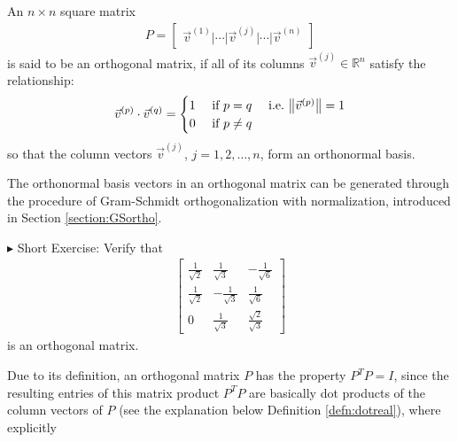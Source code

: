 \begin{defn}
\label{defn:orthomatrix}
An $n \times n$ square matrix
\begin{align*}
P = \begin{bmatrix}
\vec{v}^{(1)}|\cdots|\vec{v}^{(j)}|\cdots|\vec{v}^{(n)}   
\end{bmatrix}
\end{align*}
is said to be an orthogonal matrix, if all of its columns $\vec{v}^{(j)} \in \mathbb{R}^n$ satisfy the relationship:
\begin{align}
\vec{v}^{(p)} \cdot \vec{v}^{(q)} =
\begin{cases}
1 &\text{ if } p = q \quad \text{ i.e.\ } \norm{\vec{v}^{(p)}} = 1 \\
0 &\text{ if } p \neq q    
\end{cases}
\end{align}
so that the column vectors $\vec{v}^{(j)}$, $j=1,2,\ldots,n$, form an orthonormal basis.
\end{defn}
The orthonormal basis vectors in an orthogonal matrix can be generated through the procedure of Gram-Schmidt orthogonalization with normalization, introduced in Section \ref{section:GSortho}.\par
$\blacktriangleright$ Short Exercise: Verify that 
\begin{align*}
\begin{bmatrix}
\frac{1}{\sqrt{2}} & \frac{1}{\sqrt{3}} & -\frac{1}{\sqrt{6}} \\
\frac{1}{\sqrt{2}} & -\frac{1}{\sqrt{3}} & \frac{1}{\sqrt{6}} \\
0 & \frac{1}{\sqrt{3}} & \frac{\sqrt{2}}{\sqrt{3}}
\end{bmatrix}
\end{align*}
is an orthogonal matrix.\footnotemark\par
Due to its definition, an orthogonal matrix $P$ has the property $P^TP = I$, since the resulting entries of this matrix product $P^TP$ are basically dot products of the column vectors of $P$ (see the explanation below Definition \ref{defn:dotreal}), where explicitly
